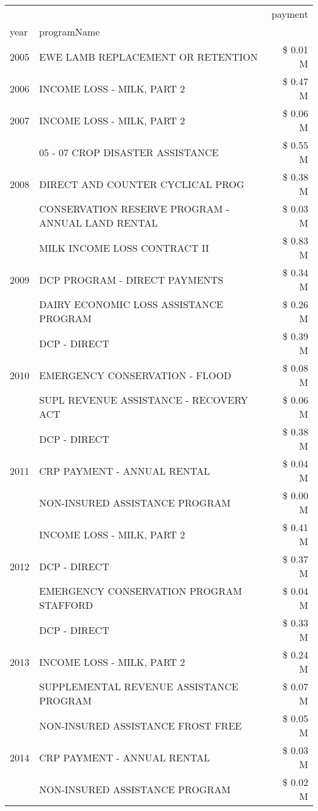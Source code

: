\begin{tabular}{llr}
\toprule
 &  & payment \\
year & programName &  \\
\midrule
2005 & EWE LAMB REPLACEMENT OR RETENTION & \$ 0.01 M \\
\cline{1-3}
2006 & INCOME LOSS - MILK, PART 2 & \$ 0.47 M \\
\cline{1-3}
2007 & INCOME LOSS - MILK, PART 2 & \$ 0.06 M \\
\cline{1-3}
\multirow[t]{3}{*}{2008} & 05 - 07 CROP DISASTER ASSISTANCE & \$ 0.55 M \\
 & DIRECT AND COUNTER CYCLICAL PROG & \$ 0.38 M \\
 & CONSERVATION RESERVE PROGRAM - ANNUAL LAND RENTAL & \$ 0.03 M \\
\cline{1-3}
\multirow[t]{3}{*}{2009} & MILK INCOME LOSS CONTRACT II & \$ 0.83 M \\
 & DCP PROGRAM - DIRECT PAYMENTS & \$ 0.34 M \\
 & DAIRY ECONOMIC LOSS ASSISTANCE PROGRAM & \$ 0.26 M \\
\cline{1-3}
\multirow[t]{3}{*}{2010} & DCP - DIRECT & \$ 0.39 M \\
 & EMERGENCY CONSERVATION - FLOOD & \$ 0.08 M \\
 & SUPL REVENUE ASSISTANCE - RECOVERY ACT & \$ 0.06 M \\
\cline{1-3}
\multirow[t]{3}{*}{2011} & DCP - DIRECT & \$ 0.38 M \\
 & CRP PAYMENT - ANNUAL RENTAL & \$ 0.04 M \\
 & NON-INSURED ASSISTANCE PROGRAM & \$ 0.00 M \\
\cline{1-3}
\multirow[t]{3}{*}{2012} & INCOME LOSS - MILK, PART 2 & \$ 0.41 M \\
 & DCP - DIRECT & \$ 0.37 M \\
 & EMERGENCY CONSERVATION PROGRAM STAFFORD & \$ 0.04 M \\
\cline{1-3}
\multirow[t]{3}{*}{2013} & DCP - DIRECT & \$ 0.33 M \\
 & INCOME LOSS - MILK, PART 2 & \$ 0.24 M \\
 & SUPPLEMENTAL REVENUE ASSISTANCE PROGRAM & \$ 0.07 M \\
\cline{1-3}
\multirow[t]{3}{*}{2014} & NON-INSURED ASSISTANCE FROST FREE & \$ 0.05 M \\
 & CRP PAYMENT - ANNUAL RENTAL & \$ 0.03 M \\
 & NON-INSURED ASSISTANCE PROGRAM & \$ 0.02 M \\
\cline{1-3}

\end{tabular}
